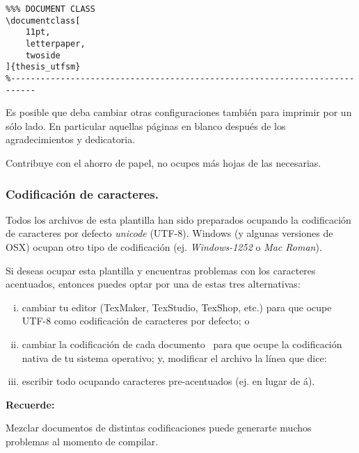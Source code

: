 \begin{Verbatim}[frame=lines, label=\inlinecode{memoria.tex} (extracto)
, fontsize=\footnotesize
, baselinestretch=1
, formatcom=\color{gray}]
%---------------------------------------------------------------------------
%%% DOCUMENT CLASS
\documentclass[
    11pt,
    letterpaper,
    twoside
]{thesis_utfsm}
%---------------------------------------------------------------------------
\end{Verbatim}


Es posible que deba cambiar otras configuraciones también para imprimir por un sólo lado. En particular aquellas páginas en blanco después de los agradecimientos y dedicatoria.

Contribuye con el ahorro de papel, no ocupes más hojas de las necesarias.

\subsubsection*{Codificación de caracteres.}

Todos los archivos  de esta plantilla han sido preparados ocupando la codificación de caracteres por defecto \emph{unicode} (UTF-8). Windows (y algunas versiones de OSX) ocupan otro tipo de codificación (ej. \emph{Windows-1252} o \emph{Mac Roman}).

Si deseas ocupar esta plantilla y encuentras problemas con los caracteres acentuados, entonces puedes optar por una de estas tres alternativas:
\begin{enumerate}[i)]
    \item cambiar tu editor (TexMaker, TexStudio, TexShop, etc.) para que ocupe UTF-8 como codificación de caracteres por defecto; o
    
    \item cambiar la codificación de cada documento  para que ocupe la codificación nativa de tu sistema operativo; y, modificar el archivo  la línea que dice:
    
    
    \item escribir todo ocupando caracteres pre-acentuados (ej.  en lugar de á).
\end{enumerate}

\vspace{10mm}
\begin{framed}
    \noindent\textbf{Recuerde:} 
    
    Mezclar documentos de distintas codificaciones puede generarte muchos problemas al momento de compilar.  
\end{framed}

